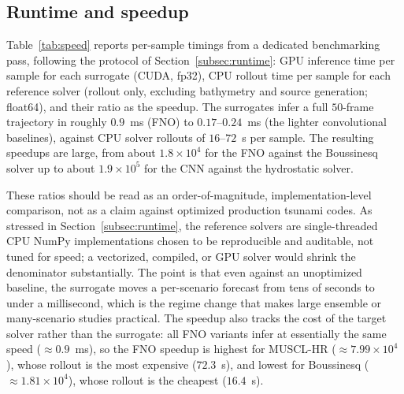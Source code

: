 \subsection{Runtime and speedup}
\label{subsec:res-speed}
Table~\ref{tab:speed} reports per-sample timings from a dedicated benchmarking pass, following the protocol of Section~\ref{subsec:runtime}: GPU inference time per sample for each surrogate (CUDA, fp32), CPU rollout time per sample for each reference solver (rollout only, excluding bathymetry and source generation; float64), and their ratio as the speedup. The surrogates infer a full $50$-frame trajectory in roughly $0.9$~ms (FNO) to $0.17$--$0.24$~ms (the lighter convolutional baselines), against CPU solver rollouts of $16$--$72$~s per sample. The resulting speedups are large, from about $1.8 \times 10 ^ {4}$ for the FNO against the Boussinesq solver up to about $1.9 \times 10 ^ {5}$ for the CNN against the hydrostatic solver.

These ratios should be read as an order-of-magnitude, implementation-level comparison, not as a claim against optimized production tsunami codes. As stressed in Section~\ref{subsec:runtime}, the reference solvers are single-threaded CPU NumPy implementations chosen to be reproducible and auditable, not tuned for speed; a vectorized, compiled, or GPU solver would shrink the denominator substantially. The point is that even against an unoptimized baseline, the surrogate moves a per-scenario forecast from tens of seconds to under a millisecond, which is the regime change that makes large ensemble or many-scenario studies practical. The speedup also tracks the cost of the target solver rather than the surrogate: all FNO variants infer at essentially the same speed ($\approx 0.9$~ms), so the FNO speedup is highest for MUSCL-HR ($\approx 7.99 \times 10 ^ {4}$), whose rollout is the most expensive ($72.3$~s), and lowest for Boussinesq ($\approx 1.81 \times 10 ^ {4}$), whose rollout is the cheapest ($16.4$~s).

